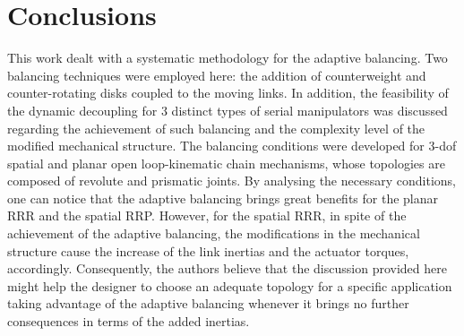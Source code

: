 \documentclass[a4paper,11pt,brazil,fleqn]{article}
\begin{document}

\section{Conclusions}\label{S04}

This work dealt with a systematic methodology for the adaptive balancing. Two balancing techniques were employed here: the addition of counterweight and counter-rotating disks coupled to the moving links. In addition, the feasibility of the dynamic decoupling for 3 distinct types of serial manipulators was discussed regarding the achievement of such balancing and the complexity level of the modified mechanical structure. The balancing conditions were developed for 3-dof spatial and planar open loop-kinematic chain mechanisms, whose topologies are composed of revolute and prismatic joints. By analysing the necessary conditions, one can notice that the adaptive balancing  brings great benefits for the planar RRR and the spatial RRP. However, for the spatial RRR, in spite of the achievement of the adaptive balancing, the modifications in the mechanical structure cause the increase of the link inertias and the actuator torques, accordingly. Consequently, the authors believe that the discussion provided here might help the designer to choose an adequate topology for a specific application taking advantage of the adaptive balancing whenever it brings no further consequences in terms of the added inertias.





{} 



\end{document}
